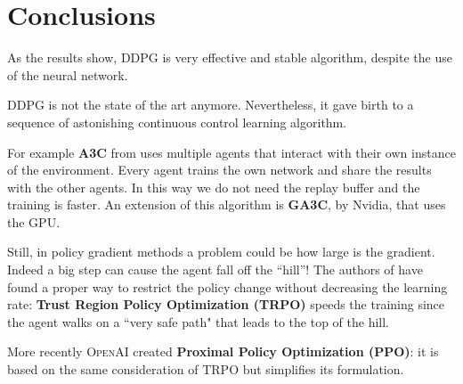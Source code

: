 \documentclass[10pt,a4paper]{scrartcl}
\begin{document}
\section{Conclusions}

As the results show, DDPG is very effective and stable algorithm, despite the use of the neural network.

DDPG is not the state of the art anymore. Nevertheless, it gave birth to a sequence of astonishing continuous control learning algorithm.

For example \textbf{A3C} from \cite{pmlr-v48-mniha16} uses multiple agents that interact with their own instance of the environment. Every agent trains the own network and share the results with the other agents. In this way we do not need the replay buffer and the training is faster. An extension of this algorithm is \textbf{GA3C}, by Nvidia, that uses the GPU.

Still, in policy gradient methods a problem could be how large is the gradient. Indeed  a big step can cause the agent fall off the ``hill''! The authors of \cite{pmlr-v37-schulman15} have found a proper way to restrict the policy change without decreasing the learning rate: \textbf{Trust Region Policy Optimization (TRPO)} speeds the training since the agent walks on a ``very safe path" that leads to the top of the hill.

More recently \textsc{OpenAI} created \textbf{Proximal Policy Optimization (PPO)}: it is based on the same consideration of TRPO but simplifies its formulation.  

\nocite{DDPG_pemami}
\nocite{Simonini}
\nocite{Ben_Lau}



\clearpage




\end{document}
